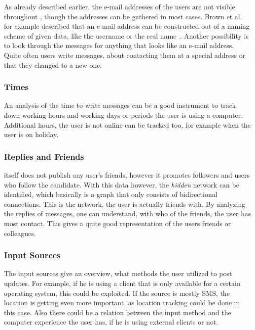 As already described earlier, the e-mail addresses of the users are not visible
throughout \Twitter{}, though the addresses can be gathered in most cases.
Brown et al. for example described that an e-mail address can be constructed
out of a naming scheme of given data, like the username or the real
name~\cite{brown2008}. Another possibility is to look through the messages for
anything that looks like an e-mail address. Quite often users write messages,
about contacting them at a special address or that they changed to a new one.

\subsubsection{Times}

An analysis of the time to write messages can be a good instrument to track
down working hours and working days or periods the user is using a computer.
Additional hours, the user is not online can be tracked too, for example
when the user is on holiday.

\subsubsection{Replies and Friends}

\Twitter{} itself does not publish any user's friends, however it promotes
followers and users who follow the candidate. With this data however, the
\textit{hidden} network can be identified, which basically is a graph that
only consists of bidirectional connections. This is the network, the user is
actually friends with. By analyzing the replies of messages, one can
understand, with who of the friends, the user has most contact. This
gives a quite good representation of the users friends or colleagues.

\subsubsection{Input Sources}

The \Twitter{} input sources give an overview, what methods the user utilized to
post updates. For example, if he is using a \Twitter{} client that is only
available for a certain operating system, this could be exploited. If the
source is mostly SMS, the location is getting even more important, as location
tracking could be done in this case. Also there could be a relation between the
input method and the computer experience the user has, if he is using external
clients or not.

